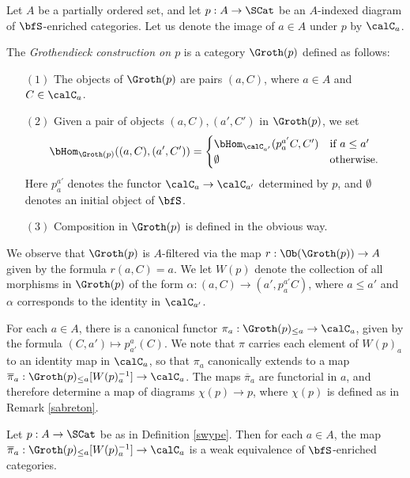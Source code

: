 \begin{Simplicial Categories}
\begin{definition}\label{swype}
Let $A$ be a partially ordered set, and let $p: A \rightarrow \SCat$ be an $A$-indexed diagram of $\bfS$-enriched categories. Let us denote the image of $a \in A$ under $p$ by $\calC_{a}$.

The {\it Grothendieck construction on $p$} is a category
$\Groth(p)$ defined as follows:
\begin{itemize}
\item[$(1)$] The objects of $\Groth(p)$ are pairs $(a, C)$, where $a \in A$ and
$C \in \calC_{a}$.
\item[$(2)$] Given a pair of objects $(a,C), (a', C')$ in $\Groth(p)$, we set
$$ \bHom_{ \Groth(p) }( (a,C), (a',C') ) = \begin{cases} \bHom_{\calC_{a'}}( p^{a'}_{a} C,
C') & \text{if } a \leq a' \\
\emptyset & \text{otherwise.} \end{cases}$$
Here $p^{a'}_{a}$ denotes the functor $\calC_{a} \rightarrow \calC_{a'}$ determined by
$p$, and $\emptyset$ denotes an initial object of $\bfS$.
\item[$(3)$] Composition in $\Groth(p)$ is defined in the obvious way.
\end{itemize}

We observe that $\Groth(p)$ is $A$-filtered via the map
$r: \Ob( \Groth(p) ) \rightarrow A$ given by the formula
$r(a,C) = a$. We let $W(p)$ denote the collection of all morphisms in
$\Groth(p)$ of the form $\alpha: (a, C) \rightarrow (a', p^{a'}_{a} C)$, where
$a \leq a'$ and $\alpha$ corresponds to the identity in $\calC_{a'}$. 

For each $a \in A$, there is a canonical functor
$\pi_{a}: \Groth(p)_{\leq a} \rightarrow \calC_{a}$, given by the formula
$(C, a') \mapsto p^{a}_{a'}(C)$. We note that $\pi$ carries
each element of $W(p)_{a}$ to an identity map in $\calC_{a}$, so that
$\pi_{a}$ canonically extends to a map $\overline{\pi}_{a}: \Groth(p)_{\leq a}[ W(p)_{a}^{-1}] \rightarrow \calC_{a}$. The maps $\overline{\pi}_{a}$ are functorial in
$a$, and therefore determine a map of diagrams $\chi(p) \rightarrow p$, where
$\chi(p)$ is defined as in Remark \ref{sabreton}.
\end{definition}

\begin{lemma}\label{cutta}
Let $p: A \rightarrow \SCat$ be as in Definition \ref{swype}. Then for each
$a \in A$, the map $\overline{\pi}_{a}: \Groth(p)_{\leq a}[ W(p)_{a}^{-1}] \rightarrow \calC_{a}$
is a weak equivalence of $\bfS$-enriched categories.
\end{lemma}


\end{Simplicial Categories}
